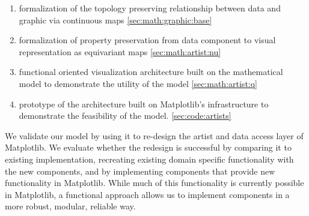 \documentclass[../main.tex]{subfiles}
\begin{document}
\begin{enumerate}
  \item formalization of the topology preserving relationship between data and graphic via continuous maps \autoref{sec:math:graphic:base}
  \item formalization of property preservation from data component to visual representation as equivariant maps \autoref{sec:math:artist:nu}
  \item functional oriented visualization architecture built on the mathematical model to demonstrate the utility of the model \autoref{sec:math:artist:q}
  \item prototype of the architecture built on Matplotlib's infrastructure to demonstrate the feasibility of the model. \autoref{sec:code:artists}
\end{enumerate}
We validate our model by using it to re-design the artist and data access layer of Matplotlib. We evaluate whether the redesign is successful by comparing it to existing implementation, recreating existing domain specific functionality with the new components, and by implementing components that provide new functionality in Matplotlib. While much of this functionality is currently possible in Matplotlib, a functional approach allows us to implement components in a more robust, modular, reliable way.
\end{document}
